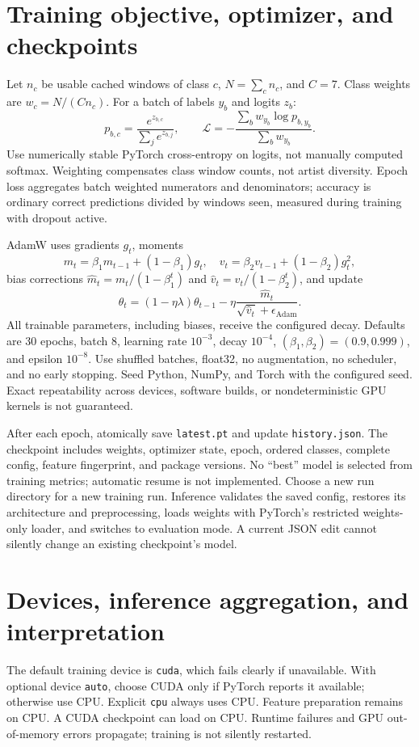\documentclass[11pt,a4paper]{article}
\begin{document}
\section{Training objective, optimizer, and checkpoints}
Let $n_c$ be usable cached windows of class $c$, $N=\sum_c n_c$, and $C=7$.
Class weights are $w_c=N/(Cn_c)$. For a batch of labels $y_b$ and logits $z_b$:
\[
p_{b,c}=\frac{e^{z_{b,c}}}{\sum_j e^{z_{b,j}}},\qquad
\mathcal L=-\frac{\sum_b w_{y_b}\log p_{b,y_b}}{\sum_b w_{y_b}}.
\]
Use numerically stable PyTorch cross-entropy on logits, not manually computed
softmax. Weighting compensates class window counts, not artist diversity.
Epoch loss aggregates batch weighted numerators and denominators; accuracy is
ordinary correct predictions divided by windows seen, measured during training
with dropout active.

AdamW uses gradients $g_t$, moments
\[
m_t=\beta_1m_{t-1}+(1-\beta_1)g_t,\quad
v_t=\beta_2v_{t-1}+(1-\beta_2)g_t^2,
\]
bias corrections $\widehat m_t=m_t/(1-\beta_1^t)$ and
$\widehat v_t=v_t/(1-\beta_2^t)$, and update
\[
\theta_t=(1-\eta\lambda)\theta_{t-1}
-\eta\frac{\widehat m_t}{\sqrt{\widehat v_t}+\epsilon_{\mathrm{Adam}}}.
\]
All trainable parameters, including biases, receive the configured decay. Defaults
are 30 epochs, batch 8, learning rate $10^{-3}$, decay $10^{-4}$,
$(\beta_1,\beta_2)=(0.9,0.999)$, and epsilon $10^{-8}$.
Use shuffled batches, float32, no augmentation, no scheduler, and no early stopping.
Seed Python, NumPy, and Torch with the configured seed. Exact repeatability across
devices, software builds, or nondeterministic GPU kernels is not guaranteed.

After each epoch, atomically save \texttt{latest.pt} and update
\texttt{history.json}. The checkpoint includes weights, optimizer state, epoch,
ordered classes, complete config, feature fingerprint, and package versions.
No ``best'' model is selected from training metrics; automatic resume is not
implemented. Choose a new run directory for a new training run. Inference
validates the saved config, restores its architecture and preprocessing, loads
weights with PyTorch's restricted weights-only loader, and switches to evaluation
mode. A current JSON edit cannot silently change an existing checkpoint's model.

\section{Devices, inference aggregation, and interpretation}
The default training device is \texttt{cuda}, which fails clearly if unavailable.
With optional device \texttt{auto}, choose CUDA only if PyTorch reports it
available; otherwise use CPU. Explicit \texttt{cpu} always uses CPU. Feature
preparation remains on CPU. A CUDA checkpoint can load on CPU. Runtime failures
and GPU out-of-memory errors propagate; training is not silently restarted.
\end{document}
